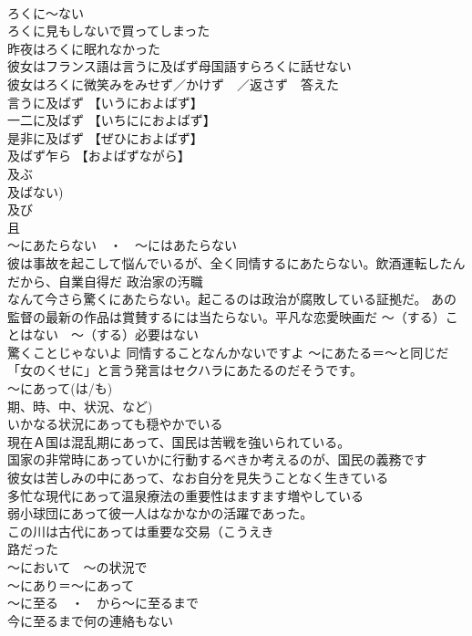 \documentclass[8pt]{extreport}
\begin{document}
\begin{CJK}{UTF8}{min}
\\	ろくに～ない	
\\	ろくに見もしないで買ってしまった 
\\	昨夜はろくに眠れなかった 
\\	彼女はフランス語は言うに及ばず母国語すらろくに話せない 
\\	彼女はろくに微笑みをみせず／かけず　／返さず　答えた 
\\	言うに及ばず 【いうにおよばず】 
\\	一二に及ばず 【いちににおよばず】 
\\	是非に及ばず 【ぜひにおよばず】 
\\	及ばず乍ら 【およばずながら】 
\\	及ぶ　
\\	及ばない) 
\\	及び　
\\	且	
\\	～にあたらない　・　～にはあたらない 
\\	彼は事故を起こして悩んでいるが、全く同情するにあたらない。飲酒運転したんだから、自業自得だ 政治家の汚職
\\	なんて今さら驚くにあたらない。起こるのは政治が腐敗している証拠だ。 あの監督の最新の作品は賞賛するには当たらない。平凡な恋愛映画だ	～（する）ことはない　～（する）必要はない 
\\	驚くことじゃないよ 同情することなんかないですよ ～にあたる＝～と同じだ 「女のくせに」と言う発言はセクハラにあたるのだそうです。
\\	～にあって(は/も) 
\\	期、時、中、状況、など) 
\\	いかなる状況にあっても穏やかでいる 
\\	現在Ａ国は混乱期にあって、国民は苦戦を強いられている。 
\\	国家の非常時にあっていかに行動するべきか考えるのが、国民の義務です 
\\	彼女は苦しみの中にあって、なお自分を見失うことなく生きている　
\\	多忙な現代にあって温泉療法の重要性はますます増やしている 
\\	弱小球団にあって彼一人はなかなかの活躍であった。 
\\	この川は古代にあっては重要な交易（こうえき 
\\	路だった 
\\	～において　～の状況で 
\\	～にあり＝～にあって
\\	～に至る　・　から～に至るまで	
\\	今に至るまで何の連絡もない 

\end{CJK}
\end{document}
